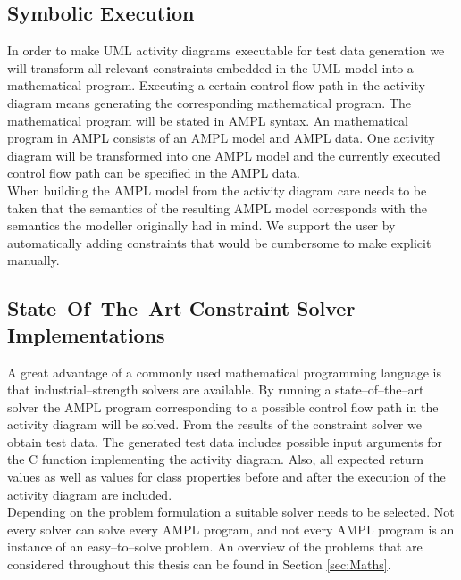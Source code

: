 \subsection{Symbolic Execution}
In order to make UML activity diagrams executable for test data generation we will transform all relevant constraints embedded in the UML model into a mathematical program. Executing a certain control flow path in the activity diagram means generating the corresponding mathematical program. The mathematical program will be stated in AMPL syntax. An mathematical program in AMPL consists of an AMPL model and AMPL data. One activity diagram will be transformed into one AMPL model and the currently executed control flow path can be specified in the AMPL data.\\
When building the AMPL model from the activity diagram care needs to be taken that the semantics of the resulting AMPL model corresponds with the semantics the modeller originally had in mind. We support the user by automatically adding constraints that would be cumbersome to make explicit manually.
\subsection{State--Of--The--Art Constraint Solver Implementations} 
A great advantage of a commonly used mathematical programming language is that industrial--strength solvers are available. By running a state--of--the--art solver the AMPL program corresponding to a possible control flow path in the activity diagram will be solved. From the results of the constraint solver we obtain test data. The generated test data includes possible input arguments for the C function implementing the activity diagram. Also, all expected return values as well as values for class properties before and after the execution of the activity diagram are included.\\
Depending on the problem formulation a suitable solver needs to be selected. Not every solver can solve every AMPL program, and not every AMPL program is an instance of an easy--to--solve problem. An overview of the problems that are considered throughout this thesis can be found in Section \ref{sec:Maths}.
